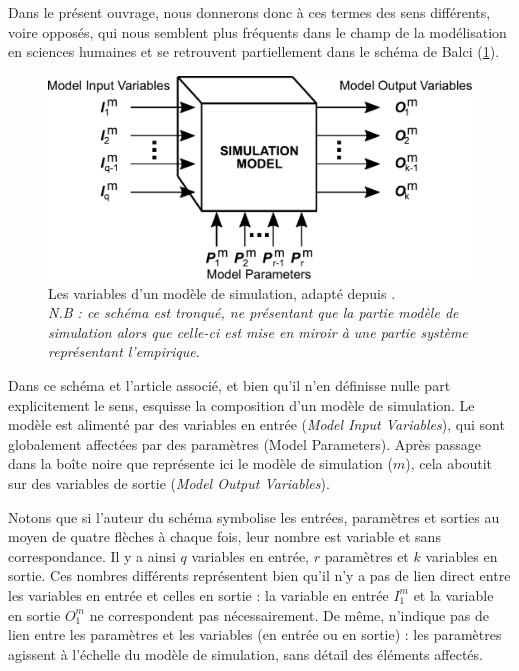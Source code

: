 Dans le présent ouvrage, nous donnerons donc à ces termes des sens différents, voire opposés, qui nous semblent plus fréquents dans le champ de la modélisation en sciences humaines et se retrouvent partiellement dans le schéma de Balci (\cref{fig:parametres-Balci}).

\begin{figure}[H]
	\centering
	\includegraphics[width=.8\linewidth]{img/schema_parametres_balci.pdf}
	\caption[Les variables d'un modèle de simulation selon \citeauthor{balci_validation_1994}]{Les variables d'un modèle de simulation, adapté depuis \textcite[122]{balci_validation_1994}.\\
	\textit{N.B : ce schéma est tronqué, ne présentant que la partie \og modèle de simulation\fg{} alors que celle-ci est mise en miroir à une partie \og système\fg{} représentant l'empirique.}}
	\label{fig:parametres-Balci} 
\end{figure}

Dans ce schéma et l'article associé, et bien qu'il n'en définisse nulle part explicitement le sens, \citeauthor{balci_validation_1994} esquisse la composition d'un modèle de simulation.
Le modèle est alimenté par des variables en entrée (\textit{Model Input Variables}), qui sont globalement affectées par des paramètres (Model Parameters).
Après passage dans la \og boîte noire\fg{} que représente ici le modèle de simulation ($m$), cela aboutit sur des variables de sortie (\textit{Model Output Variables}).

Notons que si l'auteur du schéma symbolise les entrées, paramètres et sorties au moyen de quatre flèches à chaque fois, leur nombre est variable et sans correspondance.
Il y a ainsi $q$ variables en entrée, $r$ paramètres et $k$ variables en sortie.
Ces nombres différents représentent bien qu'il n'y a pas de lien direct entre les variables en entrée et celles en sortie : la variable en entrée $I_{1}^m$ et la variable en sortie $O_{1}^m$ ne correspondent pas nécessairement.
De même, \citeauthor{balci_validation_1994} n'indique pas de lien entre les paramètres et les variables (en entrée ou en sortie) : les paramètres agissent à l'échelle du modèle de simulation, sans détail des éléments affectés.

